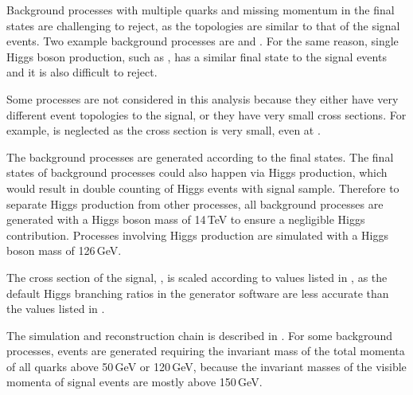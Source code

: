 
Background processes with multiple quarks and missing momentum in the final states are challenging to reject, as the topologies are similar to that of the signal events. Two example background processes are \eeTo{ \Pquark \Pquark \Pquark \Pquark \Pnu \APnu} and \HepProcess{\Pepm\Pphoton \to \Pnu \Pquark \Pquark \Pquark \Pquark}. For the same reason, single Higgs boson production, such as \eeTo{\Pquark \Pquark \PHiggs \Pnu \APnu}, has a similar final state to the signal events and it is also difficult to reject.

Some processes are not considered in this analysis because they either have very different event topologies to the signal, or they have very small cross sections. For example,  \HepProcess{\Egamma   \to \Pquark \Pquark \PHiggs \Plepton} is neglected  as the cross section is very small, even at .

The background processes are generated according to the final states. The final states of background processes could also happen via Higgs production, which would result in double counting of Higgs events with signal sample.  Therefore to separate Higgs production from other processes, all background processes are generated with a Higgs boson mass of 14\,TeV to ensure a negligible Higgs contribution. Processes involving Higgs production are simulated with a Higgs boson mass of 126\,GeV.

The cross section of the signal, \eeToHHbbWW, is scaled according to values listed in \cite{Dittmaier:2012vm}, as the default Higgs branching ratios in the generator software are less accurate than the values listed in \cite{Dittmaier:2012vm}.


The simulation and reconstruction chain is described in . For some background processes, events are generated requiring the invariant mass of the total momenta of all quarks above 50\,GeV or 120\,GeV, because the invariant masses of the visible momenta of signal events are mostly above 150\,GeV.

